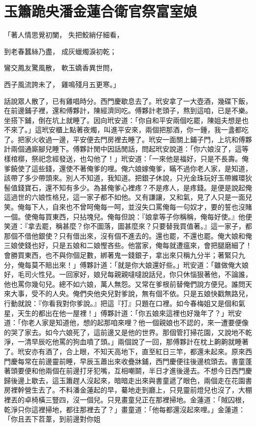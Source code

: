 %

\chapter{玉簫跪央潘金蓮\KG 合衛官祭富室娘}

「著人情思覺初闌，  失把鮫綃仔細看，

到老春蠶絲乃盡，  成灰蠟燭淚初乾；

鸞交鳳友驚風散，  軟玉嬌香異世問，

西子風流誇未了，  雞鳴殘月五更寒。」

話說眾人散了，已有雞唱時分。西門慶歇息去了。玳安拿了一大壺酒，幾碟下飯，在前邊鋪子裡，還和傅夥計，陳經濟同吃。傅夥計老頭子，熬到這咱，已是不樂。坐搭下鋪，倒在坑上就睡了。因向玳安道：「你自和平安兩個吃罷，陳姐夫想是也不來了。」這玳安櫃上點著夜燭，叫進平安來，兩個把那酒，你一鍾，我一盞都吃了。把家火收過一邊，平安便去門房裡去睡了。玳安一面關上鋪子門，上坑和傅夥計兩個通廝腳兒睡下。傅夥計閒中因話閒話，問起玳安說道：「你六娘沒了，這等樣棺槨，祭祀念經發送，也勾他了！」玳安道：「一來他是福好，只是不長壽。俺爹饒使了這些錢，還使不著俺爹的哩。俺六娘嫁俺爹，瞞不過你老人家，是知道，該帶了多少帶頭來。別人不知道，我知道。把銀子休說，只光金珠玩好玉帶縧環狄髻值錢寶石，還不知有多少。為甚俺爹心裡疼？不是疼人，是疼錢。是便是說起俺這過世的六娘性格兒，這一家子都不如他。又有謙讓，又和氣，見了人只是一面兒笑。俺每下人，自來也不曾呵俺每一呵，並沒失口罵俺每一句奴才，要的誓也沒賭一個。使俺每買東西，只拈塊兒。俺每但說：『娘拿等子你稱稱，俺每好使。』他便笑道：『拿去罷，稱甚麼？你不圖落，圖甚麼來？只要替我買值著。』這一家子，都那個不借他銀使？只有借出來，沒有個不進去的。還也罷，不還也罷。俺大娘和俺三娘使錢也好，只是五娘和二娘慳吝些。他當家，俺每就遭瘟來，會把腿磨細了！會勝買東西，也不與你個足數，綁著鬼一錢銀子，拿出來只稱九分半；著緊只九分，俺每莫不賠出來！」傅夥計道：「就是你大娘還好些。」玳安道：「雖做俺大娘好，毛司火性兒。一回家好，娘兒每親親噠噠說話兒，你只休惱狠著他，不論誰，他也罵你幾句兒。總不如六娘，萬人無怨。又常在爹根前替俺們說方便兒。誰問天來大事，受不的人央。俺們央他央兒對爹說，無有個不依。只是五娘快戳無路兒，行動就說：『你看我對你爹說。』把這『打』只題在口裡。如今春梅姐又是個和氣星，天生的都出在他一屋裡！」傅夥計道：「你五娘來這裡也好幾年了？」玳安道：「你老人家是知道他，想的起那咱來哩？他一個親娘也不認的，來一遭要便像的哭了家去。如今六娘死了，這前邊又是他的世界。那個管打掃花園，又說地不乾淨，一清早辰吃他罵的狗血噴了頭。」兩個說了一回，那傅夥計在枕上齁齁就睡著了。玳安亦有酒了，合上眼，不知天高地下，直至紅日三竿，都還未起來。原來西門慶每常在前邊靈前睡，早辰玉蕭出來收疊牀鋪，西門慶便往後邊梳頭去。書童蓬著頭要便和他兩個在前邊打牙犯嘴，互相嘲鬬，半日才進後邊去。不想今日西門慶歸後邊上歇去，這玉簫趕人沒起來，暗暗走出來與書童遞了眼色，兩個走在花園書房裡幹營生去了。不料潘金蓮起的早，驀地走到廳上，只見靈前燈兒也沒了，大棚裡丟的卓椅橫三豎四，沒一個兒。只見畫童兒正在那裡掃地。金蓮道：「賊囚根，乾淨只你這裡掃地，都往那裡去了？」畫童道：「他每都還沒起來哩。」金蓮道：「你且丟下苕葦，到前邊對你姐